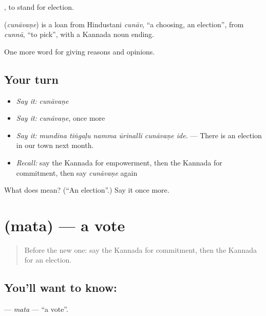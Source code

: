 , to stand for election.

\begin{cousinweb}
\textbf{} (\emph{cunāvaṇe}) is a loan from Hindustani \emph{cunāv}, \textquotedblleft{}a choosing, an election\textquotedblright{}, from \emph{cunnā}, \textquotedblleft{}to pick\textquotedblright{}, with a Kannada noun ending.
\end{cousinweb}

\begin{grammarlens}[title={What you've built}]
One more word for giving reasons and opinions.
\end{grammarlens}

\subsection*{Your turn}
\begin{itemize}
\raggedright
  \item \emph{Say it:} \emph{cunāvaṇe}
  \item \emph{Say it:} \emph{cunāvaṇe}, once more
  \item \emph{Say it:} \emph{mundina tiṅgaḷu namma ūrinalli cunāvaṇe ide.} — There is an election in our town next month.
  \item \emph{Recall:} say the Kannada for empowerment, then the Kannada for commitment, then say \emph{cunāvaṇe} again
\end{itemize}

\begin{tcolorbox}[breakable,colback=teal!4,colframe=teal!35!black,title={Before you move on}]
What does  mean? (\textquotedblleft{}An election\textquotedblright{}.) Say it once more.
\end{tcolorbox}
\section[\texorpdfstring{\kn{ಮತ} (mata)}{ಮತ (mata)}]{ (mata) — a vote}

\label{lesson:KA-C392-mata}



\begin{quote}
Before the new one: say the Kannada for commitment, then the Kannada for an election.
\end{quote}

\subsection*{You'll want to know: }
\textbf{} — \emph{mata} — \textquotedblleft{}a vote\textquotedblright{}.

